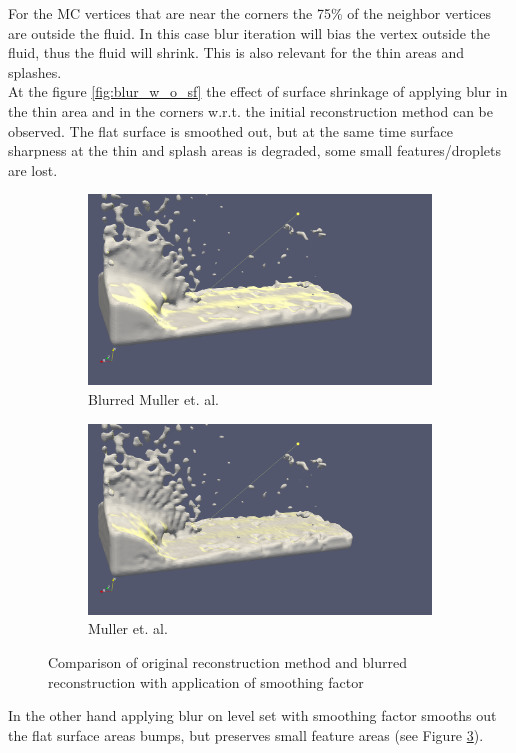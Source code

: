 For the MC vertices that are near the corners the 75\% of the neighbor vertices are outside the fluid. In this case blur iteration will bias the vertex outside the fluid, thus the fluid will shrink. This is also relevant for the thin areas and splashes.\\
At the figure \ref{fig:blur_w_o_sf} the effect of surface shrinkage of applying blur in the thin area and in the corners w.r.t. the initial reconstruction method can be observed. The flat surface is smoothed out, but at the same time surface sharpness at the thin and splash areas is degraded, some small features/droplets are lost.
\begin{figure}
        \begin{subfigure}[b]{0.5\textwidth}
				\includegraphics[width=\textwidth]{figures/DenvityBasedSplashArea2.png}
				\caption{Blurred Muller et. al.}
				\label{fig:blur_with_sf}
        \end{subfigure}
        \begin{subfigure}[b]{0.5\textwidth}
               \includegraphics[width=\textwidth]{figures/DenvityBlurredSplashArea2.png}
               \caption{Muller et. al.}
               \label{fig:db_rec}
        \end{subfigure}
       \caption{Comparison of original reconstruction method and blurred reconstruction with application of smoothing factor}
       \label{fig:blur_thin_area_with_sf}
 \end{figure}
In the other hand applying blur on level set with smoothing factor smooths out the flat surface areas bumps, but preserves small feature areas (see Figure \ref{fig:blur_thin_area_with_sf}).

